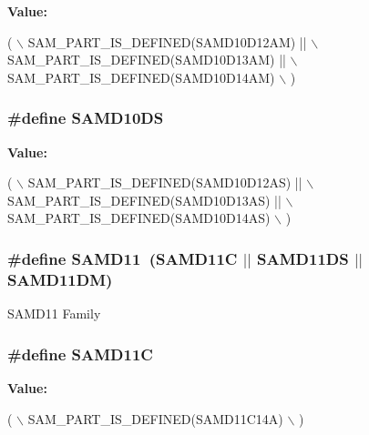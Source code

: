 {\bfseries Value\-:}
\begin{DoxyCode}
( \(\backslash\)
                SAM\_PART\_IS\_DEFINED(SAMD10D12AM) || \(\backslash\)
                SAM\_PART\_IS\_DEFINED(SAMD10D13AM) || \(\backslash\)
                SAM\_PART\_IS\_DEFINED(SAMD10D14AM) \(\backslash\)
        )
\end{DoxyCode}
\hypertarget{group__sam__part__macros__group_gaad8cc1805b7c030a384ba343b1fc475f}{
\subsubsection[{S\-A\-M\-D10\-D\-S}]{\setlength{\rightskip}{0pt plus 5cm}\#define S\-A\-M\-D10\-D\-S}}\label{group__sam__part__macros__group_gaad8cc1805b7c030a384ba343b1fc475f}
{\bfseries Value\-:}
\begin{DoxyCode}
( \(\backslash\)
                SAM\_PART\_IS\_DEFINED(SAMD10D12AS) || \(\backslash\)
                SAM\_PART\_IS\_DEFINED(SAMD10D13AS) || \(\backslash\)
                SAM\_PART\_IS\_DEFINED(SAMD10D14AS) \(\backslash\)
        )
\end{DoxyCode}
\hypertarget{group__sam__part__macros__group_ga9e5edb5637174377186d92141e7f60d9}{
\subsubsection[{S\-A\-M\-D11}]{\setlength{\rightskip}{0pt plus 5cm}\#define S\-A\-M\-D11~(S\-A\-M\-D11\-C $|$$|$ S\-A\-M\-D11\-D\-S $|$$|$ S\-A\-M\-D11\-D\-M)}}\label{group__sam__part__macros__group_ga9e5edb5637174377186d92141e7f60d9}
S\-A\-M\-D11 Family \hypertarget{group__sam__part__macros__group_ga04267f2c27b0e5c265d7cf75e41728b5}{
\subsubsection[{S\-A\-M\-D11\-C}]{\setlength{\rightskip}{0pt plus 5cm}\#define S\-A\-M\-D11\-C}}\label{group__sam__part__macros__group_ga04267f2c27b0e5c265d7cf75e41728b5}
{\bfseries Value\-:}
\begin{DoxyCode}
( \(\backslash\)
                SAM\_PART\_IS\_DEFINED(SAMD11C14A) \(\backslash\)
        )
\end{DoxyCode}
